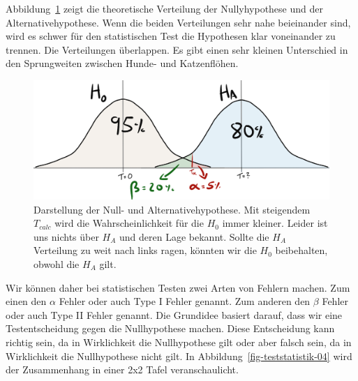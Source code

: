 \documentclass[
  letterpaper,
  DIV=11,
  oneside]{scrreport}
\begin{document}
Abbildung~\ref{fig-teststatistik-03} zeigt die theoretische Verteilung
der Nullyhypothese und der Alternativehypothese. Wenn die beiden
Verteilungen sehr nahe beieinander sind, wird es schwer für den
statistischen Test die Hypothesen klar voneinander zu trennen. Die
Verteilungen überlappen. Es gibt einen sehr kleinen Unterschied in den
Sprungweiten zwischen Hunde- und Katzenflöhen.

\begin{figure}

{\centering \includegraphics{./images/t-verteilung_03.png}

}

\caption{\label{fig-teststatistik-03}Darstellung der Null- und
Alternativehypothese. Mit steigendem \(T_{calc}\) wird die
Wahrscheinlichkeit für die \(H_0\) immer kleiner. Leider ist uns nichts
über \(H_A\) und deren Lage bekannt. Sollte die \(H_A\) Verteilung zu
weit nach links ragen, könnten wir die \(H_0\) beibehalten, obwohl die
\(H_A\) gilt.}

\end{figure}

{}

Wir können daher bei statistischen Testen zwei Arten von Fehlern machen.
Zum einen den \(\alpha\) Fehler oder auch Type I Fehler genannt. Zum
anderen den \(\beta\) Fehler oder auch Type II Fehler genannt. Die
Grundidee basiert darauf, dass wir eine Testentscheidung gegen die
Nullhypothese machen. Diese Entscheidung kann richtig sein, da in
Wirklichkeit die Nullhypothese gilt oder aber falsch sein, da in
Wirklichkeit die Nullhypothese nicht gilt. In
Abbildung~\ref{fig-teststatistik-04} wird der Zusammenhang in einer 2x2
Tafel veranschaulicht.
\end{document}
